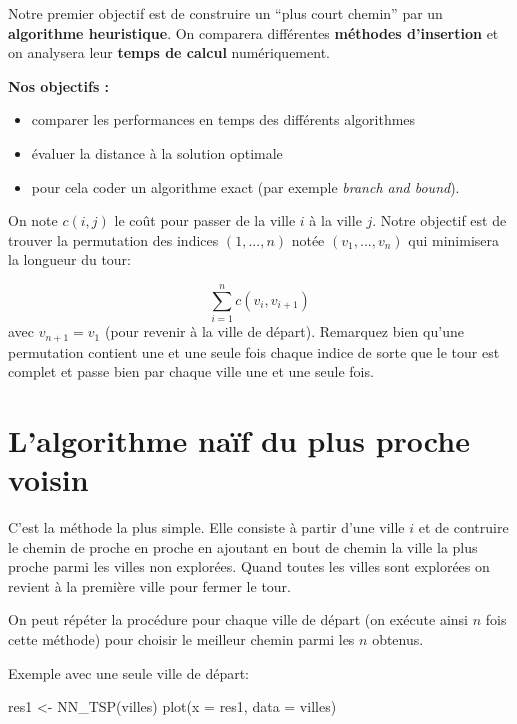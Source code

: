 \documentclass[
]{article}
\newenvironment{Shaded}{\begin{snugshade}}{\end{snugshade}}
\newcommand{\AttributeTok}[1]{\textcolor[rgb]{0.77,0.63,0.00}{#1}}
\newcommand{\FunctionTok}[1]{\textcolor[rgb]{0.00,0.00,0.00}{#1}}
\newcommand{\NormalTok}[1]{#1}
\newcommand{\OtherTok}[1]{\textcolor[rgb]{0.56,0.35,0.01}{#1}}
\begin{document}
Notre premier objectif est de construire un ``plus court chemin'' par un
\textbf{algorithme heuristique}. On comparera différentes
\textbf{méthodes d'insertion} et on analysera leur \textbf{temps de
calcul} numériquement.

\textbf{Nos objectifs : }

\begin{itemize}
\item
  comparer les performances en temps des différents algorithmes
\item
  évaluer la distance à la solution optimale
\item
  pour cela coder un algorithme exact (par exemple \emph{branch and
  bound}).
\end{itemize}

On note \(c(i,j)\) le coût pour passer de la ville \(i\) à la ville
\(j\). Notre objectif est de trouver la permutation des indices
\((1,...,n)\) notée \((v_1,...,v_n)\) qui minimisera la longueur du
tour:

\[\sum_{i=1}^{n}c(v_i,v_{i+1})\] avec \(v_{n+1} = v_1\) (pour revenir à
la ville de départ). Remarquez bien qu'une permutation contient une et
une seule fois chaque indice de sorte que le tour est complet et passe
bien par chaque ville une et une seule fois.

\hypertarget{lalgorithme-nauxeff-du-plus-proche-voisin}{%
\section{L'algorithme naïf du plus proche
voisin}\label{lalgorithme-nauxeff-du-plus-proche-voisin}}

C'est la méthode la plus simple. Elle consiste à partir d'une ville
\(i\) et de contruire le chemin de proche en proche en ajoutant en bout
de chemin la ville la plus proche parmi les villes non explorées. Quand
toutes les villes sont explorées on revient à la première ville pour
fermer le tour.

On peut répéter la procédure pour chaque ville de départ (on exécute
ainsi \(n\) fois cette méthode) pour choisir le meilleur chemin parmi
les \(n\) obtenus.

Exemple avec une seule ville de départ:

\begin{Shaded}
\begin{Highlighting}[]
\NormalTok{res1 }\OtherTok{\textless{}{-}} \FunctionTok{NN\_TSP}\NormalTok{(villes)}
\FunctionTok{plot}\NormalTok{(}\AttributeTok{x =}\NormalTok{ res1, }\AttributeTok{data =}\NormalTok{ villes)}
\end{Highlighting}
\end{Shaded}
\end{document}
